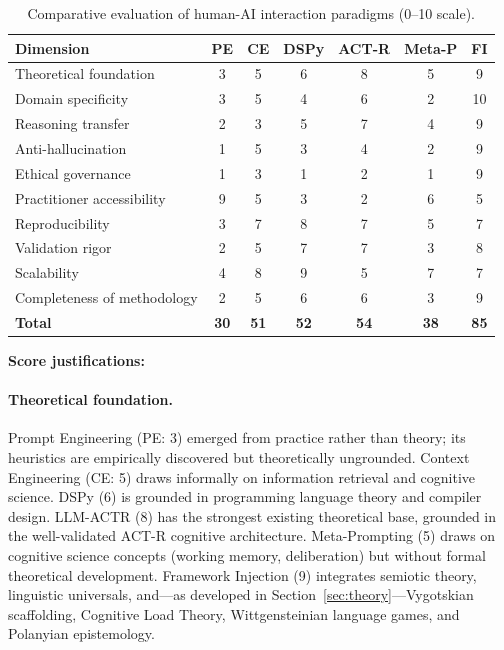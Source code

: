 \documentclass[12pt,a4paper]{article}
\begin{document}
\begin{table}[H]
\centering
\caption{Comparative evaluation of human-AI interaction paradigms (0--10 scale).}
\label{tab:comparison}
\small
\begin{tabular}{@{}lcccccc@{}}
\toprule
\textbf{Dimension} & \textbf{PE} & \textbf{CE} & \textbf{DSPy} & \textbf{ACT-R} & \textbf{Meta-P} & \textbf{FI} \\
\midrule
Theoretical foundation     & 3  & 5  & 6  & 8  & 5  & 9  \\
Domain specificity          & 3  & 5  & 4  & 6  & 2  & 10 \\
Reasoning transfer          & 2  & 3  & 5  & 7  & 4  & 9  \\
Anti-hallucination          & 1  & 5  & 3  & 4  & 2  & 9  \\
Ethical governance           & 1  & 3  & 1  & 2  & 1  & 9  \\
Practitioner accessibility  & 9  & 5  & 3  & 2  & 6  & 5  \\
Reproducibility             & 3  & 7  & 8  & 7  & 5  & 7  \\
Validation rigor            & 2  & 5  & 7  & 7  & 3  & 8  \\
Scalability                 & 4  & 8  & 9  & 5  & 7  & 7  \\
Completeness of methodology & 2  & 5  & 6  & 6  & 3  & 9  \\
\midrule
\textbf{Total}              & \textbf{30} & \textbf{51} & \textbf{52} & \textbf{54} & \textbf{38} & \textbf{85} \\
\bottomrule
\end{tabular}
\end{table}

\textbf{Score justifications:}

\paragraph{Theoretical foundation.}
Prompt Engineering (PE: 3) emerged from practice rather than theory; its heuristics are empirically discovered but theoretically ungrounded. Context Engineering (CE: 5) draws informally on information retrieval and cognitive science. DSPy (6) is grounded in programming language theory and compiler design. LLM-ACTR (8) has the strongest existing theoretical base, grounded in the well-validated ACT-R cognitive architecture. Meta-Prompting (5) draws on cognitive science concepts (working memory, deliberation) but without formal theoretical development. Framework Injection (9) integrates semiotic theory, linguistic universals, and---as developed in Section~\ref{sec:theory}---Vygotskian scaffolding, Cognitive Load Theory, Wittgensteinian language games, and Polanyian epistemology.
\end{document}
